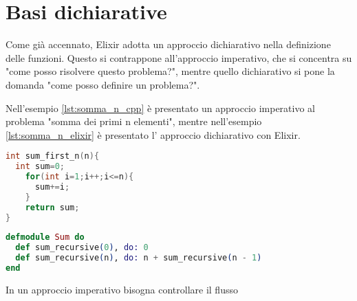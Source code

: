 \section{Basi dichiarative}

Come già accennato, Elixir adotta un approccio
dichiarativo nella definizione delle funzioni.
Questo si contrappone all'approccio imperativo,
che si concentra su "come posso risolvere questo problema?",
mentre quello dichiarativo si pone la domanda 
"come posso definire un problema?".

Nell'esempio \ref{lst:somma_n_cpp} è presentato un approccio
imperativo al problema "somma dei primi n elementi", mentre
nell'esempio \ref{lst:somma_n_elixir} è presentato l' approccio dichiarativo
con Elixir.

\renewcommand\lstlistingname{Esempio}

\begin{lstlisting}[language=cpp, caption={Somma N elementi},captionpos=b,
	label={lst:somma_n_cpp}]
int sum_first_n(n){
  int sum=0;
    for(int i=1;i++;i<=n){
      sum+=i;
    }
    return sum;
}
\end{lstlisting}

\begin{lstlisting}[language=elixir, caption={Somma N elementi},captionpos=b,
	label={lst:somma_n_elixir}]
defmodule Sum do
  def sum_recursive(0), do: 0
  def sum_recursive(n), do: n + sum_recursive(n - 1)
end
\end{lstlisting}

In un approccio imperativo bisogna controllare il flusso



